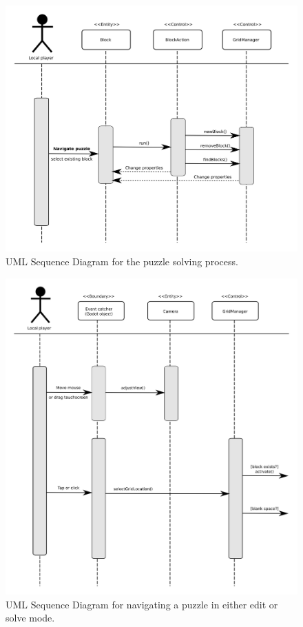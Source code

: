 \documentclass[12pt]{article}
\begin{document}
    \begin{figure}[H]
        \centering
        \includegraphics[width=6in]{sequence_solve.png}
        \caption{UML Sequence Diagram for the puzzle solving process.}
    \end{figure}


    \begin{figure}[H]
        \centering
        \includegraphics[width=6in]{sequence_navigate_puzzle.png}
        \caption{UML Sequence Diagram for navigating a puzzle in either edit or
        solve mode.}
    \end{figure}
\end{document}
